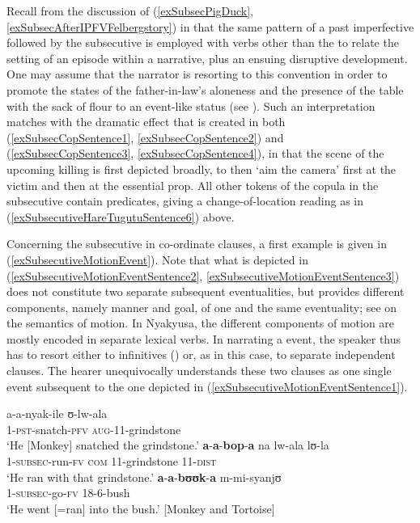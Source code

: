 Recall from the discussion of (\ref{exSubsecPigDuck}, \ref{exSubsecAfterIPFVFelbergstory}) in 
 that the same pattern of a past imperfective followed by the subsecutive is employed with verbs other than the  to relate the setting of an episode within a narrative, plus an ensuing disruptive development. One may assume that the narrator is resorting to this convention in order to promote the states of the father-in-law's aloneness and the presence of the table with the sack of flour to an event-like status (see \citealt[25]{LongacreR1996}). Such an interpretation matches with the dramatic effect that is created in both (\ref{exSubsecCopSentence1}, \ref{exSubsecCopSentence2}) and (\ref{exSubsecCopSentence3}, \ref{exSubsecCopSentence4}), in that the scene of the upcoming killing is first depicted broadly, to then \lq aim the camera' first at the victim and then at the essential prop. All other tokens of the copula in the subsecutive contain  predicates, giving a change-of-location reading as in (\ref{exSubsecutiveHareTugutuSentence6}) above.

Concerning the subsecutive in co-ordinate clauses, a first example is given in (\ref{exSubsecutiveMotionEvent}). Note that what is depicted in (\ref{exSubsecutiveMotionEventSentence2}, \ref{exSubsecutiveMotionEventSentence3}) does not constitute two separate subsequent eventualities, but provides different components, namely manner and goal, of one and the same  eventuality; see \citet{TalmyL1985} on the semantics of motion. In Nyakyusa, the different components of motion are mostly encoded in separate lexical verbs. In narrating a  event, the speaker thus has to resort either to infinitives () or, as in this case, to separate independent clauses. The hearer unequivocally understands these two clauses as one single event subsequent to the one depicted in (\ref{exSubsecutiveMotionEventSentence1}).

\begin{exe}
\ex
\label{exSubsecutiveMotionEvent}
\begin{xlist}
\ex \label{exSubsecutiveMotionEventSentence1} \gll a-a-nyak-ile ʊ-lw-ala\\
1-\textsc{pst}-snatch-\textsc{pfv} \textsc{aug}-11-grindstone\\
\glt \lq He [Monkey] snatched the grindstone.'
\ex \label{exSubsecutiveMotionEventSentence2}\gll \textbf{a}-\textbf{a}-\textbf{bop}-\textbf{a} na lw-ala lʊ-la\\
1-\textsc{subsec}-run-\textsc{fv} \textsc{com} 11-grindstone 11-\textsc{dist}\\
\glt \lq He ran with that grindstone.'%
\ex \label{exSubsecutiveMotionEventSentence3}\gll \textbf{a}-\textbf{a}-\textbf{bʊʊk}-\textbf{a} m-mi-syanjʊ\\
1-\textsc{subsec}-go-\textsc{fv} 18-6-bush\\
\glt \lq He went [=ran] into the bush.' [Monkey and Tortoise]
\end{xlist}
\end{exe}

